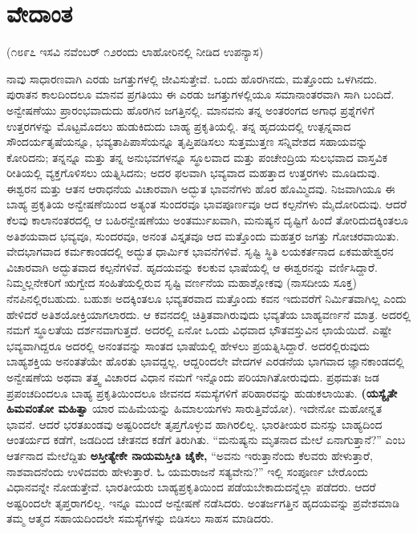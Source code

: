 
\chapter{ವೇದಾಂತ}

\begin{center}
(೧೮೯೭ ಇಸವಿ ನವೆಂಬರ್​ ೧೨ರಂದು ಲಾಹೋರಿನಲ್ಲಿ ನೀಡಿದ ಉಪನ್ಯಾಸ)
\end{center}

ನಾವು ಸಾಧಾರಣವಾಗಿ ಎರಡು ಜಗತ್ತುಗಳಲ್ಲಿ ಜೀವಿಸುತ್ತೇವೆ. ಒಂದು ಹೊರಗಿನದು, ಮತ್ತೊಂದು ಒಳಗಿನದು. ಪುರಾತನ ಕಾಲದಿಂದಲೂ ಮಾನವ ಪ್ರಗತಿಯು ಈ ಎರಡು ಜಗತ್ತುಗಳಲ್ಲಿಯೂ ಸಮಾನಾಂತರವಾಗಿ ಸಾಗಿ ಬಂದಿದೆ. ಅನ್ವೇಷಣೆಯು ಪ್ರಾರಂಭವಾದುದು ಹೊರಗಿನ ಜಗತ್ತಿನಲ್ಲಿ. ಮಾನವನು ತನ್ನ ಅಂತರಂಗದ ಅಗಾಧ ಪ್ರಶ್ನೆಗಳಿಗೆ ಉತ್ತರಗಳನ್ನು ಮೊಟ್ಟಮೊದಲು ಹುಡುಕಿದುದು ಬಾಹ್ಯ ಪ್ರಕೃತಿಯಲ್ಲಿ. ತನ್ನ ಹೃದಯದಲ್ಲಿ ಉತ್ಪನ್ನವಾದ ಸೌಂದರ್ಯತೃಷೆಯನ್ನೂ, ಭವ್ಯತಾಪಿಪಾಸೆಯನ್ನೂ ತೃಪ್ತಿಪಡಿಸಲು ಸುತ್ತಮುತ್ತಣ ಸನ್ನಿವೇಶದ ಸಹಾಯವನ್ನು ಕೋರಿದನು; ತನ್ನನ್ನೂ ಮತ್ತು ತನ್ನ ಅನುಭವಗಳನ್ನೂ ಸ್ಥೂಲವಾದ ಮತ್ತು ಪಂಚೇಂದ್ರಿಯ ಸುಲಭವಾದ ವಾಸ್ತವಿಕ ರೀತಿಯಲ್ಲಿ ವ್ಯಕ್ತಗೊಳಿಸಲು ಯತ್ನಿಸಿದನು; ಅದರ ಫಲವಾಗಿ ಭವ್ಯವಾದ ಮಹತ್ತಾದ ಉತ್ತರಗಳು ಮೂಡಿದುವು. ಈಶ್ವರನ ಮತ್ತು ಆತನ ಆರಾಧನೆಯ ವಿಚಾರವಾಗಿ ಅದ್ಭುತ ಭಾವನೆಗಳು ಹೊರ ಹೊಮ್ಮಿದವು. ನಿಜವಾಗಿಯೂ ಈ ಬಾಹ್ಯ ಪ್ರಕೃತಿಯ ಅನ್ವೇಷಣೆಯಿಂದ ಅತ್ಯಂತ ಸುಂದರವೂ ಭಾವಪೂರ್ಣವೂ ಆದ ಕಲ್ಪನೆಗಳು ಮೈದೋರಿದುವು. ಆದರೆ ಕೆಲವು ಕಾಲಾನಂತರದಲ್ಲಿ ಆ ಬಹಿರನ್ವೇಷಣೆಯು ಅಂತರ್ಮುಖವಾಗಿ, ಮನುಷ್ಯನ ದೃಷ್ಟಿಗೆ ಹಿಂದೆ ತೋರಿದುದಕ್ಕಿಂತಲೂ ಅತಿಶಯವಾದ ಭವ್ಯವೂ, ಸುಂದರವೂ, ಅನಂತ ವಿಸ್ತೃತವೂ ಆದ ಮತ್ತೊಂದು ಮಹತ್ತರ ಜಗತ್ತು ಗೋಚರವಾಯಿತು. ವೇದಭಾಗವಾದ ಕರ್ಮಕಾಂಡದಲ್ಲಿ ಅದ್ಭುತ ಧಾರ್ಮಿಕ ಭಾವನೆಗಳಿವೆ. ಸೃಷ್ಟಿ ಸ್ಥಿತಿ ಲಯಕರ್ತನಾದ ಏಕಮಹೇಶ್ವರನ ವಿಚಾರವಾಗಿ ಅದ್ಭುತವಾದ ಕಲ್ಪನೆಗಳಿವೆ. ಹೃದಯವನ್ನು ಕಲಕುವ ಭಾಷೆಯಲ್ಲಿ ಆ ಈಶ್ವರನನ್ನು ವರ್ಣಿಸಿದ್ದಾರೆ. ನಿಮ್ಮಲ್ಲನೇಕರಿಗೆ ಋಗ್ವೇದ ಸಂಹಿತೆಯಲ್ಲಿರುವ ಸೃಷ್ಟಿ ವರ್ಣನೆಯ ಮಹಾಶ್ಲೋಕವು (ನಾಸದೀಯ ಸೂಕ್ತ) ನೆನಪಿನಲ್ಲಿರಬಹುದು. ಬಹುಶಃ ಅದಕ್ಕಿಂತಲೂ ಭವ್ಯತರವಾದ ಮತ್ತೊಂದು ಕವನ ಇದುವರೆಗೆ ನಿರ್ಮಿತವಾಗಿಲ್ಲ ಎಂದು ಹೇಳಿದರೆ ಅತಿಶಯೋಕ್ತಿಯಾಗಲಾರದು. ಆ ಕವನದಲ್ಲಿ ಚಿತ್ರಿತವಾಗಿರುವುದು ಭವ್ಯತೆಯ ಬಾಹ್ಯವರ್ಣನೆ ಮಾತ್ರ. ಅದರಲ್ಲಿ ನಮಗೆ ಸ್ಥೂಲತೆಯ ದರ್ಶನವಾಗುತ್ತದೆ. ಅದರಲ್ಲಿ ಏನೋ ಒಂದು ವಿಧವಾದ ಭೌತವಸ್ತುವಿನ ಛಾಯೆಯಿದೆ. ಎಷ್ಟೇ ಭವ್ಯವಾಗಿದ್ದರೂ ಅದರಲ್ಲಿ ಅನಂತವನ್ನು ಸಾಂತದ ಭಾಷೆಯಲ್ಲಿ ಹೇಳಲು ಪ್ರಯತ್ನಿಸಿದ್ದಾರೆ. ಅದರಲ್ಲಿರುವುದು ಬಾಹ್ಯಶಕ್ತಿಯ ಅನಂತತೆಯೇ ಹೊರತು ಭಾವದ್ದಲ್ಲ. ಆದ್ದರಿಂದಲೇ ವೇದಗಳ ಎರಡನೆಯ ಭಾಗವಾದ ಜ್ಞಾನಕಾಂಡದಲ್ಲಿ ಅನ್ವೇಷಣೆಯ ಅಥವಾ ತತ್ತ್ವ ವಿಚಾರದ ವಿಧಾನ ನಮಗೆ ಇನ್ನೊಂದು ಪರಿಯಾಗಿತೋರುವುದು. ಪ್ರಥಮತಃ ಜಡ ಪ್ರಪಂಚದಿಂದಲೂ ಬಾಹ್ಯ ಪ್ರಕೃತಿಯಿಂದಲೂ ಜೀವನದ ಸಮಸ್ಯೆಗಳಿಗೆ ಪರಿಹಾರವನ್ನು ಹುಡುಕಲಾಯಿತು. \textbf{(ಯಸ್ಯೈತೇ ಹಿಮವಂತೋ ಮಹಿತ್ವಾ} ಯಾರ ಮಹಿಮೆಯನ್ನು ಹಿಮಾಲಯಗಳು ಸಾರುತ್ತಿವೆಯೋ). ಇದೇನೋ ಮಹೋನ್ನತ ಭಾವನೆ. ಆದರೆ ಭರತಖಂಡವು ಅಷ್ಟರಿಂದಲೇ ತೃಪ್ತಗೊಳ್ಳುವ ಹಾಗಿರಲಿಲ್ಲ. ಭಾರತೀಯರ ಮನಸ್ಸು ಬಾಹ್ಯದಿಂದ ಆಂತರ್ಯದ ಕಡೆಗೆ, ಜಡದಿಂದ ಚೇತನದ ಕಡೆಗೆ ತಿರುಗಿತು. “ಮನುಷ್ಯನು ಮೃತನಾದ ಮೇಲೆ ಏನಾಗುತ್ತಾನೆ?” ಎಂಬ ಆರ್ತನಾದ ಮೇಲೆದ್ದಿತು \textbf{ಅಸ್ತೀತ್ಯೇಕೇ ನಾಯಮಸ್ತೀತಿ ಚೈಕೇ,} “ಅವನು ಇರುತ್ತಾನೆಂದು ಕೆಲವರು ಹೇಳುತ್ತಾರೆ, ನಾಶವಾದನೆಂದು ಉಳಿದವರು ಹೇಳುತ್ತಾರೆ. ಓ ಯಮರಾಜನೆ ಸತ್ಯವೇನು?” ಇಲ್ಲಿ ಸಂಪೂರ್ಣ ಬೇರೊಂದು ವಿಧಾನವನ್ನೇ ನೋಡುತ್ತೇವೆ. ಭಾರತೀಯರು ಬಾಹ್ಯಪ್ರಕೃತಿಯಿಂದ ಪಡೆಯಬೇಕಾದುದನ್ನೆಲ್ಲಾ ಪಡೆದರು. ಆದರೆ ಅಷ್ಟರಿಂದಲೇ ತೃಪ್ತರಾಗಲಿಲ್ಲ. ಇನ್ನೂ ಮುಂದೆ ಅನ್ವೇಷಣೆ ನಡೆಸಿದರು. ಅಂತರ್ಜಗತ್ತಿನ ಹೃದಯವನ್ನು ಪ್ರವೇಶಮಾಡಿ ತಮ್ಮ ಆತ್ಮದ ಸಹಾಯದಿಂದಲೇ ಸಮಸ್ಯೆಗಳನ್ನು ಬಿಡಿಸಲು ಸಾಹಸ ಮಾಡಿದರು.

